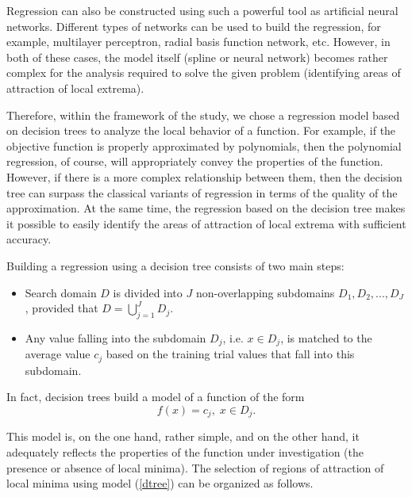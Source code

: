 \documentclass[entropy,article,submit,moreauthors,pdftex]{Definitions/mdpi}
\begin{document}
Regression can also be constructed using such a powerful tool as artificial neural networks. 
Different types of networks can be used to build the regression, for example, multilayer perceptron, radial basis function network, etc.
However, in both of these cases, the model itself (spline or neural network) becomes rather complex for the analysis required to solve the given problem (identifying areas of attraction of local extrema).

Therefore, within the framework of the study, we chose a regression model based on decision trees to analyze the local behavior of a function.
For example, if the objective function is properly approximated by polynomials, then the polynomial regression, of course, will appropriately convey the properties of the function. However, if there is a more complex relationship between them, then the decision tree can surpass the classical variants of regression in terms of the quality of the approximation. 
At the same time, the regression based on the decision tree makes it possible to easily identify the areas of attraction of local extrema with sufficient accuracy.

Building a regression using a decision tree consists of two main steps:
\begin{itemize}
	\item Search domain $D$ is divided into $J$ non-overlapping subdomains  $D_1, D_2, ..., D_J$, provided that $D = \bigcup_{j=1}^{J}{D_j}$.
	\item Any value falling into the subdomain $D_j$, i.e. $x \in D_j$, is matched to the average value  $c_j$ based on the training trial values that fall into this subdomain. 
\end{itemize}

In fact, decision trees build a model of a function of the form
\begin{equation}\label{dtree}
f(x) = c_j, \; x\in D_j.
\end{equation}
 
This model is, on the one hand, rather simple, and on the other hand, it adequately reflects the properties of the function under investigation (the presence or absence of local minima). The selection of regions of attraction of local minima using model (\ref{dtree}) can be organized as follows.
\end{document}
